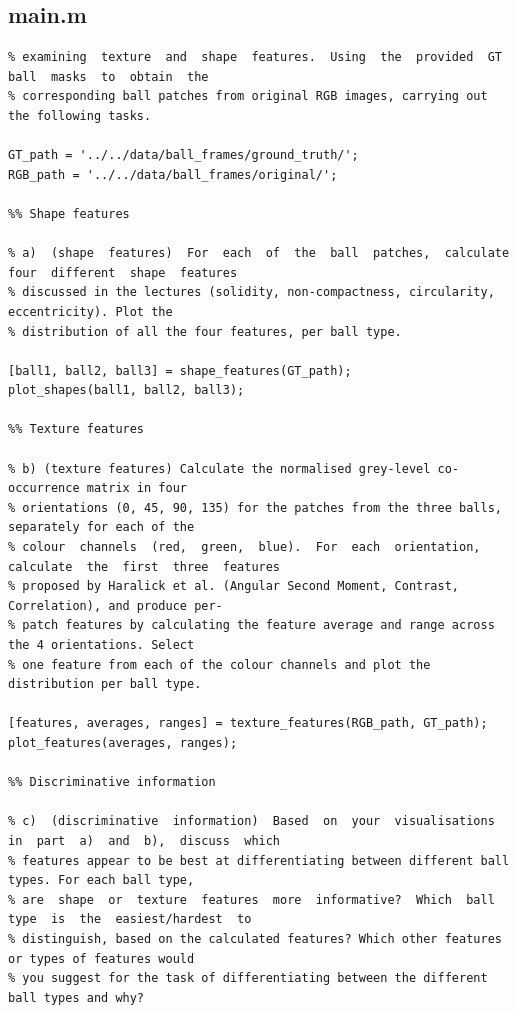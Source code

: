 \documentclass[conference]{IEEEtran}
\begin{document}
        \subsection{main.m}
            \begin{lstlisting}[style=Matlab-editor, basicstyle=\scriptsize]
% This  part  of  the  assignment  will  deal  with  feature  extraction,  more  specifically  you  will  be 
% examining  texture  and  shape  features.  Using  the  provided  GT  ball  masks  to  obtain  the 
% corresponding ball patches from original RGB images, carrying out the following tasks.  

GT_path = '../../data/ball_frames/ground_truth/';
RGB_path = '../../data/ball_frames/original/';

%% Shape features

% a)  (shape  features)  For  each  of  the  ball  patches,  calculate  four  different  shape  features 
% discussed in the lectures (solidity, non-compactness, circularity, eccentricity). Plot the 
% distribution of all the four features, per ball type.

[ball1, ball2, ball3] = shape_features(GT_path);
plot_shapes(ball1, ball2, ball3);

%% Texture features

% b) (texture features) Calculate the normalised grey-level co-occurrence matrix in four 
% orientations (0, 45, 90, 135) for the patches from the three balls, separately for each of the 
% colour  channels  (red,  green,  blue).  For  each  orientation,  calculate  the  first  three  features 
% proposed by Haralick et al. (Angular Second Moment, Contrast, Correlation), and produce per-
% patch features by calculating the feature average and range across the 4 orientations. Select 
% one feature from each of the colour channels and plot the distribution per ball type.

[features, averages, ranges] = texture_features(RGB_path, GT_path);
plot_features(averages, ranges);

%% Discriminative information

% c)  (discriminative  information)  Based  on  your  visualisations  in  part  a)  and  b),  discuss  which 
% features appear to be best at differentiating between different ball types. For each ball type, 
% are  shape  or  texture  features  more  informative?  Which  ball  type  is  the  easiest/hardest  to 
% distinguish, based on the calculated features? Which other features or types of features would 
% you suggest for the task of differentiating between the different ball types and why?
            \end{lstlisting}
\end{document}
